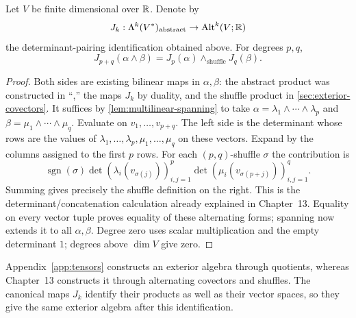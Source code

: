 \begin{proposition}\label{prop:abstract-shuffle-compatibility}
Let $V$ be finite dimensional over $\mathbb{R}$. Denote by
\[
J_k:\Lambda^k(V^*)_{\mathrm{abstract}}\to\operatorname{Alt}^k(V;\mathbb{R})
\]
the determinant-pairing identification obtained above. For degrees $p,q$,
\[
J_{p+q}(\alpha\wedge\beta)
=J_p(\alpha)\wedge_{\mathrm{shuffle}}J_q(\beta).
\]
\end{proposition}
\begin{proof}
Both sides are existing bilinear maps in $\alpha,\beta$: the abstract
product was constructed in ``,'' the maps
$J_k$ by duality, and the shuffle product in \cref{sec:exterior-covectors}.
It suffices by \cref{lem:multilinear-spanning} to take
$\alpha=\lambda_1\wedge\cdots\wedge\lambda_p$ and
$\beta=\mu_1\wedge\cdots\wedge\mu_q$.
Evaluate on $v_1,\ldots,v_{p+q}$. The left side is the determinant whose
rows are the values of $\lambda_1,\ldots,\lambda_p,\mu_1,\ldots,\mu_q$
on these vectors. Expand by the columns assigned to the first $p$ rows.
For each $(p,q)$-shuffle $\sigma$ the contribution is
\[
\operatorname{sgn}(\sigma)
\det(\lambda_i(v_{\sigma(j)}))_{i,j=1}^{p}
\det(\mu_i(v_{\sigma(p+j)}))_{i,j=1}^{q}.
\]
Summing gives precisely the shuffle definition on the right. This is the
determinant/concatenation calculation already explained in Chapter~13.
Equality on every vector tuple proves equality of these alternating forms;
spanning now extends it to all $\alpha,\beta$. Degree zero uses scalar
multiplication and the empty determinant $1$; degrees above $\dim V$ give zero.
\end{proof}
Appendix~\ref{app:tensors} constructs an exterior algebra through quotients, whereas
Chapter~13 constructs it through alternating covectors and shuffles.
The canonical maps $J_k$ identify their products as well as their vector
spaces, so they give the same exterior algebra after this identification.

